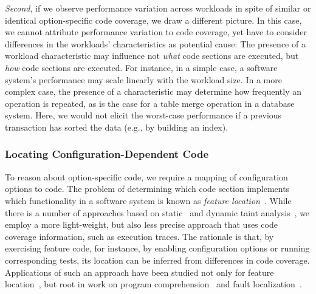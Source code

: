 {{{\textit{Second}, if we observe performance variation across workloads in spite of similar or identical option-specific code coverage, we draw a different picture. In this case, we cannot attribute performance variation to code coverage, yet have to consider differences in the workloads’ characteristics as potential cause: The presence of a workload characteristic may influence not  \emph{what} code sections are executed, but \emph{how} code sections are executed. For instance, in a simple case, a software system’s performance may scale linearly with the workload size. In a more complex case, the presence of a characteristic may determine how frequently an operation is repeated, as is the case for a table merge operation in a database system. Here, we would not elicit the worst-case performance if a previous transaction has sorted the data (e.g., by building an index).
\color{black}

\subsubsection{Locating Configuration-Dependent Code}
To reason about option-specific code, we require a mapping of configuration options to code. 
The problem of determining which code section implements which functionality in a software system is known as \emph{feature location}~\cite{rubin_feature_2013}. 
While there is a number of approaches based on static~\cite{velez_2020_configcrusher_jase,lillack_2018_lotrack_tse,luo_2019_cova} and dynamic taint analysis~\cite{bell_phosphor_2014,velez_comprex_2021,splat_kim_2013}, we employ a more light-weight,  but also less precise approach that uses code coverage information, such as execution traces.
The rationale is that, by exercising feature code, for instance, by enabling configuration options or running corresponding tests, its location can be inferred from differences in code coverage. 
Applications of such an approach have been studied not only for feature location~\cite{wong_integrated_2005,sulir_annotation_2015,michelon_spectrum_2021,perez_framing_2016}, but root in work on program comprehension~\cite{wilde_early_1996,wilde_reconnaissance_1995,sherwood_reducing_nodate,perez_diagnosis_2014,castro_pangolin_2019} and fault localization~\cite{agrawal_fault_1995,wong_faultloc_2016}. 


}}}
